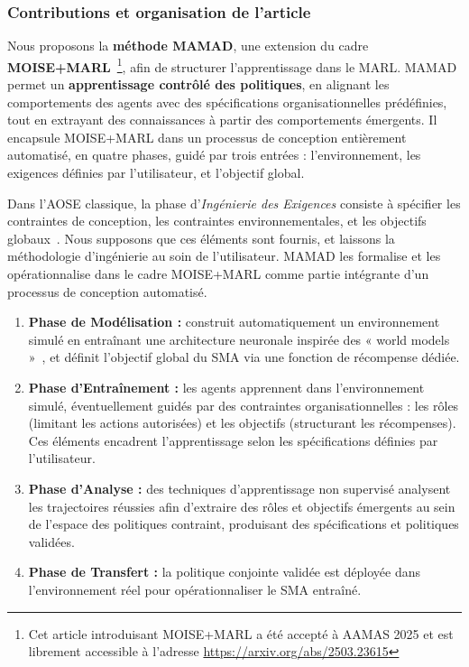 \subsubsection{Contributions et organisation de l'article}

Nous proposons la \textbf{méthode MAMAD}, une extension du cadre \textbf{MOISE+MARL}~\cite{soule2025moisemarl}\footnote{Cet article introduisant MOISE+MARL a été accepté à AAMAS 2025 et est librement accessible à l'adresse \url{https://arxiv.org/abs/2503.23615}}, afin de structurer l'apprentissage dans le MARL. MAMAD permet un \textbf{apprentissage contrôlé des politiques}, en alignant les comportements des agents avec des spécifications organisationnelles prédéfinies, tout en extrayant des connaissances à partir des comportements émergents. Il encapsule MOISE+MARL dans un processus de conception entièrement automatisé, en quatre phases, guidé par trois entrées : l'environnement, les exigences définies par l'utilisateur, et l'objectif global.

Dans l'AOSE classique, la phase d'\textit{Ingénierie des Exigences} consiste à spécifier les contraintes de conception, les contraintes environnementales, et les objectifs globaux~\cite{Pavon2003, Bernon2005}. Nous supposons que ces éléments sont fournis, et laissons la méthodologie d'ingénierie au soin de l'utilisateur. MAMAD les formalise et les opérationnalise dans le cadre MOISE+MARL comme partie intégrante d'un processus de conception automatisé.

\begin{enumerate}
    \item \textbf{Phase de Modélisation :} construit automatiquement un environnement simulé en entraînant une architecture neuronale inspirée des « world models »~\cite{Ha2018}, et définit l'objectif global du SMA via une fonction de récompense dédiée.
    \item \textbf{Phase d'Entraînement :} les agents apprennent dans l'environnement simulé, éventuellement guidés par des contraintes organisationnelles : les rôles (limitant les actions autorisées) et les objectifs (structurant les récompenses). Ces éléments encadrent l'apprentissage selon les spécifications définies par l'utilisateur.
    \item \textbf{Phase d'Analyse :} des techniques d'apprentissage non supervisé analysent les trajectoires réussies afin d'extraire des rôles et objectifs émergents au sein de l'espace des politiques contraint, produisant des spécifications et politiques validées.
    \item \textbf{Phase de Transfert :} la politique conjointe validée est déployée dans l'environnement réel pour opérationnaliser le SMA entraîné.
\end{enumerate}

